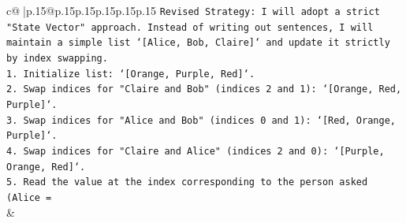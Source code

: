\documentclass{article}
\begin{document}
{\begin{supertabular}{c@{$\;$}|p{.15\linewidth}@{}p{.15\linewidth}p{.15\linewidth}p{.15\linewidth}p{.15\linewidth}p{.15\linewidth}}
{{{\texttt{Revised Strategy: I will adopt a strict "State Vector" approach. Instead of writing out sentences, I will maintain a simple list `{[}Alice, Bob, Claire{]}` and update it strictly by index swapping.} \\
\texttt{1. Initialize list: `{[}Orange, Purple, Red{]}`.} \\
\texttt{2. Swap indices for "Claire and Bob" (indices 2 and 1): `{[}Orange, Red, Purple{]}`.} \\
\texttt{3. Swap indices for "Alice and Bob" (indices 0 and 1): `{[}Red, Orange, Purple{]}`.} \\
\texttt{4. Swap indices for "Claire and Alice" (indices 2 and 0): `{[}Purple, Orange, Red{]}`.} \\
\texttt{5. Read the value at the index corresponding to the person asked (Alice =} \\
            }
        }
    }
    & \\ \\

\end{supertabular}
}
\end{document}
